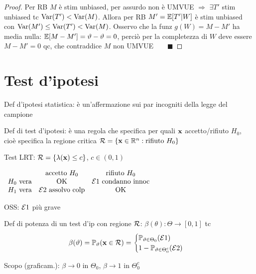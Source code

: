\begin{proof}
Per RB $M$ è stim unbiased, per assurdo non è UMVUE $\Rightarrow$ $\exists T'$ stim unbiased tc $\operatorname{Var}(T')<\operatorname{Var}(M)$. Allora per RB $M'=\mathbb{E}[T'|W]$ è stim unbiased con $\operatorname{Var}(M')\leq \operatorname{Var}(T')<\operatorname{Var}(M)$. Osservo che la funz $g(W)=M-M'$ ha media nulla: $\mathbb{E}[M-M']=\vartheta-\vartheta=0$, perciò per la completezza di $W$ deve essere $M-M'=0$ qc, che contraddice $M$ non UMVUE$\qquad \blacksquare$
\end{proof}


\section{Test d'ipotesi}


Def d'ipotesi statistica: è un'affermazione sui par incogniti della legge del campione

\smallskip

Def di test d'ipotesi: è una regola che specifica per quali $\mathbf{x}$ accetto/rifiuto $H_0$, cioè specifica la regione critica $\mathcal{R}=\{\mathbf{x}\in\mathbb{R}^n:\text{rifiuto }H_0\}$

\smallskip

Test LRT: $\mathcal{R}=\{\lambda(\mathbf{x})\leq c\}$, $c\in(0,1)$

\smallskip

$\begin{array}{ccc}
& \text{accetto }H_0 & \text{rifiuto }H_0 \\
H_0\text{ vera} & \text{OK} & \mathcal{E}1\text{ condanno innoc} \\
H_1\text{ vera} & \mathcal{E}2\text{ assolvo colp} & \text{OK}
\end{array}$ 

\smallskip

OSS: $\mathcal{E}1$ più grave

\smallskip

Def di potenza di un test d'ip con regione $\mathcal{R}$: $\beta(\theta):\Theta\to[0,1]$ tc 
\begin{equation*}
\beta(\vartheta)=\mathbb{P}_\vartheta(\mathbf{x}\in\mathcal{R})=\begin{cases}
\mathbb{P}_{\vartheta\in\Theta_0}(\mathcal{E}1) \\
1-\mathbb{P}_{\vartheta\in\Theta_0^c}(\mathcal{E}2)
\end{cases}
\end{equation*}

Scopo (graficam.): $\beta\to 0$ in $\Theta_0$, $\beta\to1$ in $\Theta_0^c$


